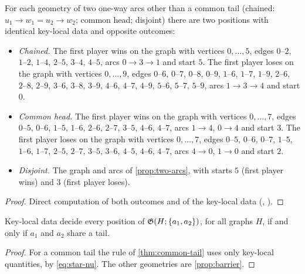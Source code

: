 \begin{proposition}\label{prop:barrier}
For each geometry of two one-way arcs other than a common tail (chained: $u_1\to w_1=u_2\to w_2$; common head; disjoint) there are two positions with identical key-local data and opposite outcomes:
\begin{itemize}
\item \emph{Chained.} The first player wins on the graph with vertices $0,\dots,5$, edges $0\text{--}2$, $1\text{--}2$, $1\text{--}4$, $2\text{--}5$, $3\text{--}4$, $4\text{--}5$, arcs $0\to3\to1$ and start $5$. The first player loses on the graph with vertices $0,\dots,9$, edges $0\text{--}6$, $0\text{--}7$, $0\text{--}8$, $0\text{--}9$, $1\text{--}6$, $1\text{--}7$, $1\text{--}9$, $2\text{--}6$, $2\text{--}8$, $2\text{--}9$, $3\text{--}6$, $3\text{--}8$, $3\text{--}9$, $4\text{--}6$, $4\text{--}7$, $4\text{--}9$, $5\text{--}6$, $5\text{--}7$, $5\text{--}9$, arcs $1\to3\to4$ and start $0$.
\item \emph{Common head.} The first player wins on the graph with vertices $0,\dots,7$, edges $0\text{--}5$, $0\text{--}6$, $1\text{--}5$, $1\text{--}6$, $2\text{--}6$, $2\text{--}7$, $3\text{--}5$, $4\text{--}6$, $4\text{--}7$, arcs $1\to4$, $0\to4$ and start $3$. The first player loses on the graph with vertices $0,\dots,7$, edges $0\text{--}5$, $0\text{--}6$, $0\text{--}7$, $1\text{--}5$, $1\text{--}6$, $1\text{--}7$, $2\text{--}5$, $2\text{--}7$, $3\text{--}5$, $3\text{--}6$, $4\text{--}5$, $4\text{--}6$, $4\text{--}7$, arcs $4\to0$, $1\to0$ and start $2$.
\item \emph{Disjoint.} The graph and arcs of \cref{prop:two-arcs}, with starts $5$ (first player wins) and $3$ (first player loses).
\end{itemize}
\end{proposition}
\begin{proof}
Direct computation of both outcomes and of the key-local data (, ).
\end{proof}

\begin{corollary}\label{cor:dichotomy}
Key-local data decide every position of $\mathfrak{G}(H;\{a_1,a_2\})$, for all graphs $H$, if and only if $a_1$ and $a_2$ share a tail.
\end{corollary}
\begin{proof}
For a common tail the rule of \cref{thm:common-tail} uses only key-local quantities, by \eqref{eq:star-nu}. The other geometries are \cref{prop:barrier}.
\end{proof}

